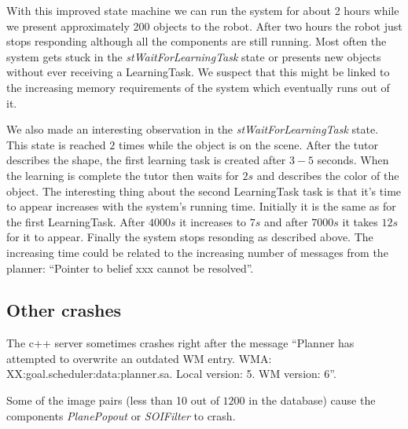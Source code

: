 \documentclass{article}
\begin{document}
With this improved state machine we can run the system for about 2 hours while
we present approximately 200 objects to the robot. After two hours the robot
just stops responding although all the components are still running. Most often
the system gets stuck in the {\em stWaitForLearningTask} state or presents new
objects without ever receiving a LearningTask.  We suspect that this might be
linked to the increasing memory requirements of the system which eventually
runs out of it.

We also made an interesting observation in the {\em stWaitForLearningTask}
state. This state is reached $2$ times while the object is on the scene. After
the tutor describes the shape, the first learning task is created after $3-5$
seconds. When the learning is complete the tutor then waits for $2s$ and
describes the color of the object.  The interesting thing about the second
LearningTask task is that it's time to appear increases with the system's
running time. Initially it is the same as for the first LearningTask. After
$4000s$ it increases to $7s$ and after $7000s$ it takes $12s$ for it to appear.
Finally the system stops resonding as described above.  The increasing time
could be related to the increasing number of messages from the planner:
``Pointer to belief xxx cannot be resolved''.

\subsection{Other crashes}

The c++ server sometimes crashes right after the message ``Planner has
attempted to overwrite an outdated WM entry. WMA:
XX:goal.scheduler:data:planner.sa.  Local version: 5.  WM version: 6''.

Some of the image pairs (less than 10 out of $1200$ in the database) cause the
components {\em PlanePopout} or {\em SOIFilter} to crash.
\end{document}
